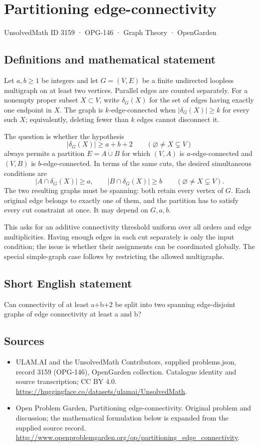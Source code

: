 \documentclass[11pt,a4paper]{article}
\begin{document}
\section*{Partitioning edge-connectivity}\label{3159}
{\small UnsolvedMath ID 3159 · OPG-146 · Graph Theory · OpenGarden}
\subsection{Definitions and mathematical statement}
Let $a,b\geq1$ be integers and let $G=(V,E)$ be a finite
undirected loopless multigraph on at least two vertices. Parallel
edges are counted separately. For a nonempty proper subset
$X\subset V$, write $\delta_G(X)$ for the set of edges having
exactly one endpoint in $X$. The graph is $k$-edge-connected
when $|\delta_G(X)|\geq k$ for every such $X$; equivalently,
deleting fewer than $k$ edges cannot disconnect it.

The question is whether the hypothesis
\[
 |\delta_G(X)|\geq a+b+2
 \qquad(\varnothing\neq X\subsetneq V)
\]
always permits a partition $E=A\mathbin{\dot\cup}B$ for which
$(V,A)$ is $a$-edge-connected and $(V,B)$ is $b$-edge-connected.
In terms of the same cuts, the desired simultaneous conditions are
\[
 |A\cap\delta_G(X)|\geq a,\qquad
 |B\cap\delta_G(X)|\geq b
 \qquad(\varnothing\neq X\subsetneq V).
\]
The two resulting graphs must be spanning: both retain every
vertex of $G$. Each original edge belongs to exactly one of
them, and the partition has to satisfy every cut constraint
at once. It may depend on $G,a,b$.

This asks for an additive connectivity threshold uniform over
all orders and edge multiplicities. Having enough edges in
each cut separately is only the input condition; the issue is
whether their assignments can be coordinated globally. The
special simple-graph case follows by restricting the allowed
multigraphs.
\subsection{Short English statement}
Can connectivity of at least a+b+2 be split into two spanning edge-disjoint graphs of edge connectivity at least a and b?
\subsection{Sources}
\begin{itemize}
\item[S1] ULAM.AI and the UnsolvedMath Contributors, supplied problems.json, record 3159 (OPG-146), OpenGarden collection. Catalogue identity and source transcription; CC BY 4.0.
\url{https://huggingface.co/datasets/ulamai/UnsolvedMath}.
\item[S2] Open Problem Garden, Partitioning edge-connectivity. Original problem and discussion; the mathematical formulation below is expanded from the supplied source record.
\url{http://www.openproblemgarden.org/op/partitioning_edge_connectivity}.
\end{itemize}
\end{document}
